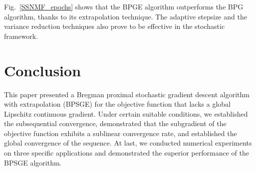 \documentclass[letterpaper]{article} %
\begin{document}
	Fig.~\ref{SSNMF_epochs} shows that the BPGE algorithm outperforms the BPG algorithm, thanks to its extrapolation technique. The adaptive stepsize and the variance reduction techniques also prove to be effective in the stochastic framework.






	\section{Conclusion}\label{conclusion}
	This paper presented a Bregman proximal stochastic gradient descent algorithm with extrapolation (BPSGE) for the objective function that
	lacks a global Lipschitz continuous gradient.  Under certain suitable conditions, we established the subsequential convergence, demonstrated that the subgradient of the objective function exhibits a sublinear convergence rate, and established the global convergence of the sequence. At last, we conducted numerical experiments on three specific applications and demonstrated the superior performance of the BPSGE algorithm.


\end{document}
